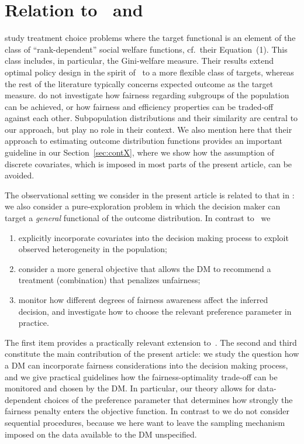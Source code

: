 \documentclass[11pt, a4paper]{article}
\theoremstyle{definition}
\begin{document}

\newpage

\appendix

\section{Relation to~\cite{kitagawa2019equality} and~\cite{kpv3}}\label{sec:reltokpv3}

\cite{kitagawa2019equality} study treatment choice problems where the target functional is an element of the class of ``rank-dependent'' social welfare functions, cf.~their Equation~(1). This class includes, in particular, the Gini-welfare measure. Their results extend optimal policy design in the spirit of~\cite{kitagawa2018should} to a more flexible class of targets, whereas the rest of the literature typically concerns expected outcome as the target measure. \cite{kitagawa2019equality} do not investigate how fairness regarding subgroups of the population can be achieved, or how fairness and efficiency properties can be traded-off against each other. Subpopulation distributions and their similarity are central to our approach, but play no role in their context. We also mention here that their approach to estimating outcome distribution functions provides an important guideline in our Section~\ref{sec:contX}, where we show how the assumption of discrete covariates, which is imposed in most parts of the present article, can be avoided. 

The observational setting we consider in the present article is related to that in \cite{kpv3}: we also consider a pure-exploration problem in which the decision maker can target a \emph{general} functional of the outcome distribution. In contrast to~\cite{kpv3} we
%
\begin{enumerate}
\item explicitly incorporate covariates into the decision making process to exploit observed heterogeneity in the population;
\item consider a more general objective that allows the DM to recommend a treatment (combination) that penalizes unfairness;
\item monitor how different degrees of fairness awareness affect the inferred decision, and investigate how to choose the relevant preference parameter in practice.
\end{enumerate}
%
The first item provides a practically relevant extension to~\cite{kpv3}. The second and third constitute the main contribution of the present article: we study the question how a DM can incorporate fairness considerations into the decision making process, and we give practical guidelines how the fairness-optimality trade-off can be monitored and chosen by the DM. In particular, our theory allows for data-dependent choices of the preference parameter that determines how strongly the fairness penalty enters the objective function. In contrast to \cite{kpv3} we do not consider sequential procedures, because we here want to leave the sampling mechanism imposed on the data available to the DM unspecified.
\end{document}
